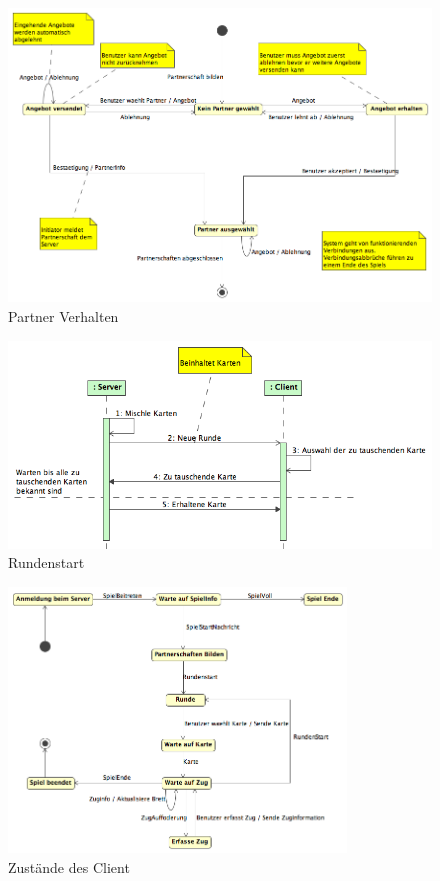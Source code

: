 \documentclass[a4paper,12pt,halfparskip,DIV14]{scrartcl}
\begin{document}
\begin{figure}
	[htp] \centering 
	\includegraphics[width=1\textwidth]{dienste_partner.png} \caption{Partner Verhalten}\label{fig:dienste_partner.png} 
\end{figure}
\begin{figure}
	[htp] \centering 
	\includegraphics[width=1\textwidth]{dienste_rundenstart.png} \caption{Rundenstart}\label{fig:dienste_rundenstart.png} 
\end{figure}
\begin{figure}
	[htp] \centering 
	\includegraphics[width=0.8\textwidth]{dienste_client.png}
	\caption{Zustände des Client}\label{fig:dienste_client.png} 
\end{figure}
\end{document}
